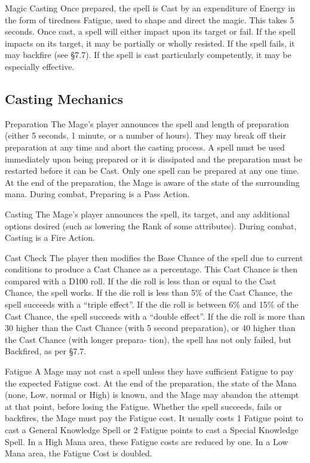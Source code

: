 \begin{Chapter}{Magic}
Casting Once prepared, the spell is Cast by an expenditure of Energy
in the form of tiredness Fatigue, used to shape and direct the magic.
This takes 5 seconds.  Once cast, a spell will either impact upon its
target or fail.  If the spell impacts on its target, it may be
partially or wholly resisted.  If the spell fails, it may backfire
(see §7.7).  If the spell is cast particularly competently, it may be
especially effective.

\subsection{Casting Mechanics}

\begin{Description}

\item[Preparation] The Mage’s player announces the spell and length of
  preparation (either 5 seconds, 1 minute, or a number of hours). They
  may break off their preparation at any time and abort the casting
  process.  A spell must be used immediately upon being prepared or it
  is dissipated and the preparation must be restarted before it can be
  Cast.  Only one spell can be prepared at any one time.  At the end
  of the preparation, the Mage is aware of the state of the
  surrounding mana.  During combat, Preparing is a Pass Action.

\item[Casting] The Mage’s player announces the spell, its target, and
  any additional options desired (such as lowering the Rank of some
  attributes).  During combat, Casting is a Fire Action.

\item[Cast Check] The player then modifies the Base Chance of the
  spell due to current conditions to produce a Cast Chance as a
  percentage.  This Cast Chance is then compared with a D100 roll.  If
  the die roll is less than or equal to the Cast Chance, the spell
  works.  If the die roll is less than 5\% of the Cast Chance, the
  spell succeeds with a “triple effect”.  If the die roll is between
  6\% and 15\% of the Cast Chance, the spell succeeds with a “double
  effect”.  If the die roll is more than 30 higher than the Cast
  Chance (with 5 second preparation), or 40 higher than the Cast
  Chance (with longer prepara- tion), the spell has not only failed,
  but Backfired, as per §7.7.

\item[Fatigue] A Mage may not cast a spell unless they have sufficient
  Fatigue to pay the expected Fatigue cost. At the end of the
  preparation, the state of the Mana (none, Low, normal or High) is
  known, and the Mage may abandon the attempt at that point, before
  losing the Fatigue.  Whether the spell succeeds, fails or backfires,
  the Mage must pay the Fatigue cost. It usually costs 1 Fatigue point
  to cast a General Knowledge Spell or 2 Fatigue points to cast a
  Special Knowledge Spell.  In a High Mana area, these Fatigue costs
  are reduced by one.  In a Low Mana area, the Fatigue Cost is
  doubled.


\end{Description}
\end{Chapter}
